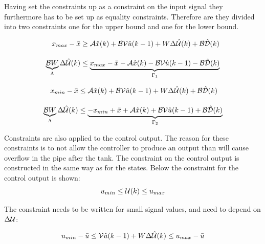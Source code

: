  Having set the constraints up as a constraint on the input signal they furthermore has to be set up as equality constraints. Therefore are they divided into two constraints one for the upper bound and one for the lower bound. 

 \begin{equation}
 \begin{aligned}
 x_{max}-\bar{x} &\geq \CMcal{A}\hat{x}(k)+\CMcal{B}\CMcal{V}\hat{u}(k-1) +W\Delta \hat{\CMcal{U}}(k)+\CMcal{B\hat{D}}(k)\\[10pt]
 \underbrace{\CMcal{B}W}_{\Lambda} \Delta\hat{\CMcal{U}}(k)&\leq \underbrace{x_{max}- \bar{x}-\CMcal{A}\hat{x}(k)-\CMcal{B}\CMcal{V}\hat{u}(k-1)-\CMcal{B}\hat{\CMcal{D}}(k)}_{\Gamma_1}
\end{aligned}
 \end{equation}  

 \begin{equation}
 \begin{aligned}
 x_{min}- \bar{x} &\leq \CMcal{A}\hat{x}(k)+\CMcal{B}\CMcal{V}\hat{u}(k-1) +W\Delta \hat{\CMcal{U}}(k)+\CMcal{B\hat{D}}(k)\\[10pt]
 \underbrace{\CMcal{B}W}_{\Lambda} \Delta\hat{\CMcal{U}}(k) &\leq \underbrace{-x_{min}+\bar{x}+\CMcal{A}\hat{x}(k)+\CMcal{B}\CMcal{V}\hat{u}(k-1)+\CMcal{B}\hat{\CMcal{D}}(k)}_{\Gamma_2}
  \end{aligned}
 \end{equation}


Constraints are also applied to the control output. The reason for these constraints is to not allow the controller to produce an output than will cause overflow in the pipe after the tank. The constraint on the control output is constructed in the same way as for the states. Below the constraint for the control output is shown:  
 \begin{equation}
 	u_{min} \leq \CMcal{U}(k) \leq u_{max}
 \end{equation}

The constraint needs to be written for small signal values, and need to depend on $\Delta \CMcal{U}$:

 \begin{equation}
 		u_{min} -  \bar{u} \leq \CMcal{V}\hat{u}(k-1)+ W\Delta\hat{\CMcal{U}}(k)  \leq  u_{max} -  \bar{u}
 \end{equation}

